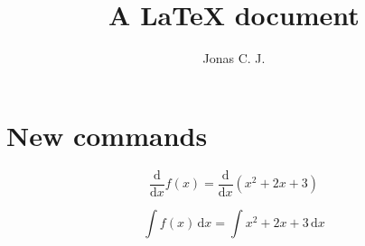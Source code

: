 \documentclass[a5paper, 12pt]{article}
\title{A \LaTeX{} document}
\author{Jonas C. J.}
\newcommand{\dif}[1]{ \frac{\mathrm{d}}{\mathrm{d} #1} }
\renewcommand{\d}[0]{\, \mathrm{d} }
\begin{document}
\section{New commands}
\begin{equation}
	\dif{x} f(x) = \dif{x} \left(x^2+2x+3\right)
\end{equation}

\begin{equation}
	\int f(x) \d x = \int x^2+2x+3 \d x
\end{equation}
\end{document}
